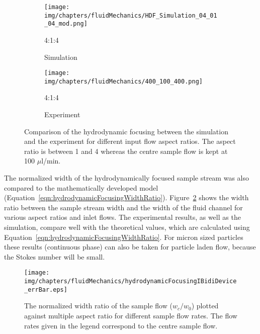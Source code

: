 \begin{figure}[htb]
\begin{subfigure}[b]{0.4\textwidth}
				\texttt{[image: img/chapters/fluidMechanics/HDF\_Simulation\_04\_01\_04\_mod.png]}
				\caption{4:1:4}
				\caption{Simulation}
        \end{subfigure}                        
        \begin{subfigure}[b]{0.4\textwidth}
				\texttt{[image: img/chapters/fluidMechanics/400\_100\_400.png]}
				\caption{4:1:4}
                \caption{Experiment}
        \end{subfigure}         
        \caption[Hydrodynamic focusing comparison between simulations and experiments]{Comparison of the hydrodynamic focusing between the simulation and the experiment for different input flow aspect ratios. The aspect ratio is between 1 and 4 whereas the centre sample flow is kept at 100 $\mu$l/min.}
        \label{fig:hydrodynamicFocusingSimulationAndExperiments}
\end{figure}

The normalized width of the hydrodynamically focused sample stream was also compared to the mathematically developed model (Equation~\ref{eqn:hydrodynamicFocusingWidthRatio}). Figure~\ref{fig:hydrodynamicFocusingNormalizedWidth} shows the width ratio between the sample stream width and the width of the fluid channel for various aspect ratios and inlet flows. The experimental results, as well as the simulation, compare well with the theoretical values, which are calculated using Equation~\ref{eqn:hydrodynamicFocusingWidthRatio}. For micron sized particles these results (continuous phase) can also be taken for particle laden flow, because the Stokes number will be small.

\begin{figure}[htb]
\centering
\texttt{[image: img/chapters/fluidMechanics/hydrodynamicFocusingIBidiDevice\_errBar.eps]}
\caption[Hydrodynamic focusing in iBidi $\mu$-slide: normalized width ratio for different aspect ratios]{The normalized width ratio of the sample flow ($w_{c}/w_{0}$) plotted against multiple aspect ratio for different sample flow rates. The flow rates given in the legend correspond to the centre sample flow.}
\label{fig:hydrodynamicFocusingNormalizedWidth}%
\end{figure} 

